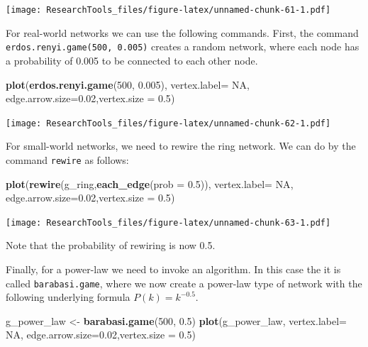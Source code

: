 \documentclass[]{article}
\newenvironment{Shaded}{\begin{snugshade}}{\end{snugshade}}
\newcommand{\KeywordTok}[1]{\textcolor[rgb]{0.13,0.29,0.53}{\textbf{#1}}}
\newcommand{\DataTypeTok}[1]{\textcolor[rgb]{0.13,0.29,0.53}{#1}}
\newcommand{\DecValTok}[1]{\textcolor[rgb]{0.00,0.00,0.81}{#1}}
\newcommand{\FloatTok}[1]{\textcolor[rgb]{0.00,0.00,0.81}{#1}}
\newcommand{\StringTok}[1]{\textcolor[rgb]{0.31,0.60,0.02}{#1}}
\newcommand{\OtherTok}[1]{\textcolor[rgb]{0.56,0.35,0.01}{#1}}
\newcommand{\NormalTok}[1]{#1}
\theoremstyle{definition}
\theoremstyle{definition}
\theoremstyle{definition}
\theoremstyle{remark}
\begin{document}
\texttt{[image: ResearchTools\_files/figure-latex/unnamed-chunk-61-1.pdf]}

For real-world networks we can use the following commands. First, the
command \texttt{erdos.renyi.game(500,\ 0.005)} creates a random network,
where each node has a probability of 0.005 to be connected to each other
node.

\begin{Shaded}
\begin{Highlighting}[]
\KeywordTok{plot}\NormalTok{(}\KeywordTok{erdos.renyi.game}\NormalTok{(}\DecValTok{500}\NormalTok{, }\FloatTok{0.005}\NormalTok{), }\DataTypeTok{vertex.label=} \OtherTok{NA}\NormalTok{, }\DataTypeTok{edge.arrow.size=}\FloatTok{0.02}\NormalTok{,}\DataTypeTok{vertex.size =} \FloatTok{0.5}\NormalTok{)}
\end{Highlighting}
\end{Shaded}

\texttt{[image: ResearchTools\_files/figure-latex/unnamed-chunk-62-1.pdf]}

For small-world networks, we need to rewire the ring network. We can do
by the command \texttt{rewire} as follows:

\begin{Shaded}
\begin{Highlighting}[]
\KeywordTok{plot}\NormalTok{(}\KeywordTok{rewire}\NormalTok{(g_ring,}\KeywordTok{each_edge}\NormalTok{(}\DataTypeTok{prob =} \FloatTok{0.5}\NormalTok{)), }\DataTypeTok{vertex.label=} \OtherTok{NA}\NormalTok{, }\DataTypeTok{edge.arrow.size=}\FloatTok{0.02}\NormalTok{,}\DataTypeTok{vertex.size =} \FloatTok{0.5}\NormalTok{)}
\end{Highlighting}
\end{Shaded}

\texttt{[image: ResearchTools\_files/figure-latex/unnamed-chunk-63-1.pdf]}

Note that the probability of rewiring is now 0.5.

Finally, for a power-law we need to invoke an algorithm. In this case
the it is called \texttt{barabasi.game}, where we now create a power-law
type of network with the following underlying formula
\(P(k) = k^{-0.5}\).

\begin{Shaded}
\begin{Highlighting}[]
\NormalTok{g_power_law <-}\StringTok{ }\KeywordTok{barabasi.game}\NormalTok{(}\DecValTok{500}\NormalTok{, }\FloatTok{0.5}\NormalTok{)}
\KeywordTok{plot}\NormalTok{(g_power_law, }\DataTypeTok{vertex.label=} \OtherTok{NA}\NormalTok{, }\DataTypeTok{edge.arrow.size=}\FloatTok{0.02}\NormalTok{,}\DataTypeTok{vertex.size =} \FloatTok{0.5}\NormalTok{)}
\end{Highlighting}
\end{Shaded}
\end{document}
